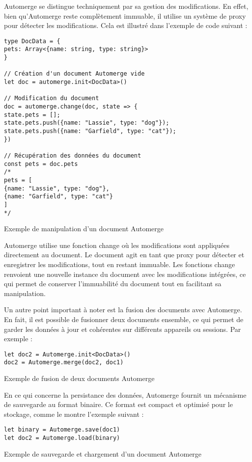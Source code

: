 Automerge se distingue techniquement par sa gestion des modifications. En effet, bien qu'Automerge reste complètement immuable, il utilise un système de proxy pour détecter les modifications. Cela est illustré dans l'exemple de code suivant :

\begin{listing}[H]
  \begin{verbatim}
type DocData = {
pets: Array<{name: string, type: string}>
}

// Création d'un document Automerge vide
let doc = automerge.init<DocData>()

// Modification du document
doc = automerge.change(doc, state => {
state.pets = [];
state.pets.push({name: "Lassie", type: "dog"});
state.pets.push({name: "Garfield", type: "cat"});
})

// Récupération des données du document
const pets = doc.pets
/*
pets = [
{name: "Lassie", type: "dog"},
{name: "Garfield", type: "cat"}
]
*/
\end{verbatim}
  \caption{Exemple de manipulation d'un document Automerge}
\end{listing}

Automerge utilise une fonction change où les modifications sont appliquées directement au document. Le document agit en tant que proxy pour détecter et enregistrer les modifications, tout en restant immuable. Les fonctions change renvoient une nouvelle instance du document avec les modifications intégrées, ce qui permet de conserver l'immuabilité du document tout en facilitant sa manipulation.

Un autre point important à noter est la fusion des documents avec Automerge. En fait, il est possible de fusionner deux documents ensemble, ce qui permet de garder les données à jour et cohérentes sur différents appareils ou sessions. Par exemple :

\begin{listing}[H]
  \begin{verbatim}
let doc2 = Automerge.init<DocData>()
doc2 = Automerge.merge(doc2, doc1)
  \end{verbatim}
  \caption{Exemple de fusion de deux documents Automerge}
\end{listing}

En ce qui concerne la persistance des données, Automerge fournit un mécanisme de sauvegarde au format binaire\cite{BinaryDocumentFormat}. Ce format est compact et optimisé pour le stockage, comme le montre l'exemple suivant :
\begin{listing}[H]
  \begin{verbatim}
let binary = Automerge.save(doc1)
let doc2 = Automerge.load(binary)
  \end{verbatim}
  \caption{Exemple de sauvegarde et chargement d'un document Automerge}
\end{listing}

